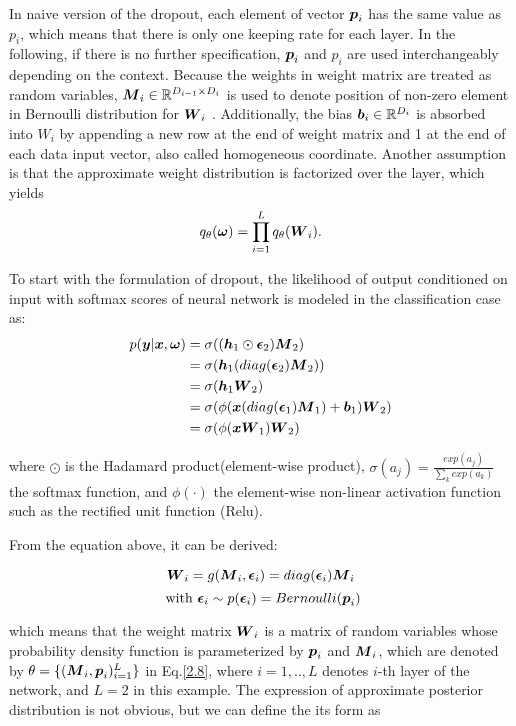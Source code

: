 In naive version of the dropout, each element of vector $\boldsymbol p_{i}$ has the same value as $p_{i}$, which means that there is only one keeping rate for each layer. In the following, if there is no further specification, $\boldsymbol p_{i}$ and $p_{i}$ are used interchangeably depending on the context. Because the weights in weight matrix are treated as random variables, $\boldsymbol M_{i} \in \mathbb R^{D_{i-1} \times D_{i}}$ is used to denote position of non-zero element in Bernoulli distribution for $\boldsymbol W_{i}$ %
. Additionally, the bias $\boldsymbol b_{i} \in \mathbb R^{D_{i}}$ is absorbed into $W_{i}$ by appending a new row at the end of weight matrix and 1 at the end of each data input vector, also called homogeneous coordinate. Another assumption is that the approximate weight distribution is factorized over the layer, which yields
\[
q_{\theta}(\boldsymbol \omega) = \prod_{i=1}^{L}q_{\theta}(\boldsymbol W_{i}). 
\]

To start with the formulation of dropout, the likelihood of output conditioned on input with softmax scores of neural network is modeled in the classification case as:
\begin{equation}
\begin{aligned} \label{dropout_form}
p(\boldsymbol y| \boldsymbol x, \boldsymbol \omega) & = \sigma((\boldsymbol h_{1} \odot \boldsymbol \epsilon_{2}) \boldsymbol M_{2})\\
& = \sigma(\boldsymbol h_{1} (diag(\boldsymbol \epsilon_{2}) \boldsymbol M_{2})) \\
& = \sigma(\boldsymbol h_{1} \boldsymbol W_{2}) \\
& = \sigma(\phi(\boldsymbol x (diag(\boldsymbol \epsilon_{1}) \boldsymbol M_{1})+ \boldsymbol b_{1}) \boldsymbol W_{2}) \\
& = \sigma(\phi(\boldsymbol x \boldsymbol W_{1})\boldsymbol W_{2})
\end{aligned}
\end{equation}

where $\odot$ is the Hadamard product(element-wise product), $\sigma(a_{j}) = \frac{exp({a_{j}})}{\sum_{k}exp({a_{k}})}$ 
the softmax function, and $\phi(\cdot)$ the element-wise non-linear activation function such as the rectified unit function (Relu).

From the equation above, it can be derived:

\[
\boldsymbol W_{i} = g(\boldsymbol M_{i}, \boldsymbol \epsilon_{i})= diag(\boldsymbol \epsilon_{i}) \boldsymbol M_{i} 
\]
\[ 
\text{ with } \boldsymbol \epsilon_{i} \sim p(\boldsymbol \epsilon_{i}) = Bernoulli(\boldsymbol p_{i}) 
\]

which means that the weight matrix $\boldsymbol W_{i}$ is a matrix of random variables whose probability density function is parameterized by $\boldsymbol p_{i}$ and $\boldsymbol M_{i}$, which are denoted by $\theta = \{ (\boldsymbol M_{i}, \boldsymbol p_{i})_{i=1}^{L} \}$ in Eq.\ref{2.8}, where $i = {1,..,L}$ denotes $i$-th layer of the network, and $L = 2$ in this example. 
The expression of approximate posterior distribution is not obvious, but we can define the its form as 

